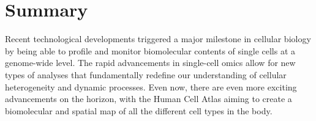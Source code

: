 

\newpage{\thispagestyle{empty}\cleardoublepage}

\newpage{\thispagestyle{empty}\cleardoublepage}
\tableofcontents 



\newpage{\thispagestyle{empty}\cleardoublepage}


\makenomenclature
\printnomenclature





\chapter*{Summary}

Recent technological developments triggered a major milestone in cellular biology by being able to profile and monitor biomolecular contents of single cells at a genome-wide level. The rapid advancements in single-cell omics allow for new types of analyses that fundamentally redefine our understanding of cellular heterogeneity and dynamic processes. Even now, there are even more exciting advancements on the horizon, with the Human Cell Atlas aiming to create a biomolecular and spatial map of all the different cell types in the body. 

